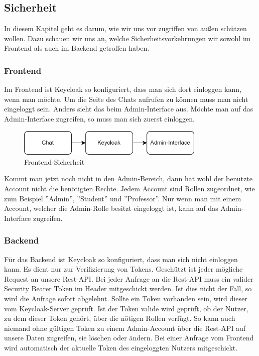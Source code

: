 \subsection{Sicherheit}
In diesem Kapitel geht es darum, wie wir uns vor zugriffen von außen schützen wollen. 
Dazu schauen wir uns an, welche Sicherheitsvorkehrungen wir sowohl im Frontend als auch 
im Backend getroffen haben.

\subsubsection{Frontend}
Im Frontend ist Keycloak so konfiguriert, dass man sich dort einloggen kann, wenn man möchte. 
Um die Seite des Chats aufrufen zu können muss man nicht eingeloggt sein. 
Anders sieht das beim Admin-Interface aus. 
Möchte man auf das Admin-Interface zugreifen, so muss man sich zuerst einloggen. 
\begin{figure}[H]
    \centering
    \includegraphics[width=0.8\textwidth]{bilder/technologien/frontend-sicherheit.png}
    \caption{Frontend-Sicherheit}
    \label{fig:Frontend_Sicherheit}
\end{figure}
\noindent Kommt man jetzt noch nicht in den Admin-Bereich, dann hat wohl der benutzte Account nicht die benötigten Rechte. 
Jedem Account sind Rollen zugeordnet, wie zum Beispiel ''Admin'', ''Student'' und ''Professor''. 
Nur wenn man mit einem Account, welcher die Admin-Rolle besitzt eingeloggt ist, kann auf das Admin-Interface zugreifen.

\subsubsection{Backend}
Für das Backend ist Keycloak so konfiguriert, dass man sich nicht einloggen kann. 
Es dient nur zur Verifizierung von Tokens. 
Geschützt ist jeder mögliche Request an unsere Rest-API. 
Bei jeder Anfrage an die Rest-API muss ein valider Security Bearer Token im Header mitgeschickt werden. 
Ist dies nicht der Fall, so wird die Anfrage sofort abgelehnt. 
Sollte ein Token vorhanden sein, wird dieser vom Keycloak-Server geprüft. 
Ist der Token valide wird geprüft, ob der Nutzer, zu dem dieser Token gehört, 
über die nötigen Rollen verfügt. 
So kann auch niemand ohne gültigen Token zu einem Admin-Account über die Rest-API auf unsere Daten zugreifen, 
sie löschen oder ändern. 
Bei einer Anfrage vom Frontend wird automatisch der aktuelle Token des eingeloggten Nutzers mitgeschickt.

